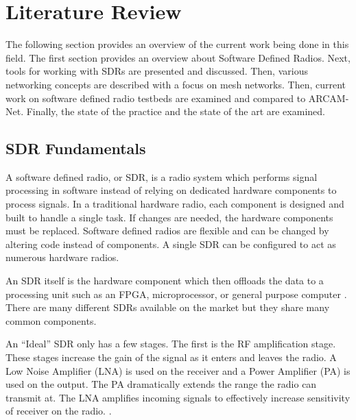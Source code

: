 
\chapter{Literature Review} %

\label{Chapter2} %

The following section provides an overview of the current work being done in this field. The first section provides an overview about Software Defined Radios. Next, tools for working with SDRs are presented and discussed. Then, various networking concepts are described with a focus on mesh networks. Then, current work on software defined radio testbeds are examined and compared to ARCAM-Net. Finally, the state of the practice and the state of the art are examined. 


\section{SDR Fundamentals}

A software defined radio, or SDR, is a radio system which performs signal processing in software instead of relying on dedicated hardware components to process signals. In a traditional hardware radio, each component is designed and built to handle a single task. If changes are needed, the hardware components must be replaced. Software defined radios are flexible and can be changed by altering code instead of components. A single SDR can be configured to act as numerous hardware radios. \cite{7043470} \cite{0018} 

An SDR itself is the hardware component which then offloads the data to a processing unit such as an FPGA, microprocessor, or general purpose computer \cite{7043470} \cite{0018}. There are many different SDRs available on the market but they share many common components. 

An ``Ideal'' SDR only has a few stages. The first is the RF amplification stage. These stages increase the gain of the signal as it enters and leaves the radio. A Low Noise Amplifier (LNA) is used on the receiver and a Power Amplifier (PA) is used on the output. The PA dramatically extends the range the radio can transmit at. The LNA amplifies incoming signals to effectively increase sensitivity of receiver on the radio.  \cite{6526408}. 

